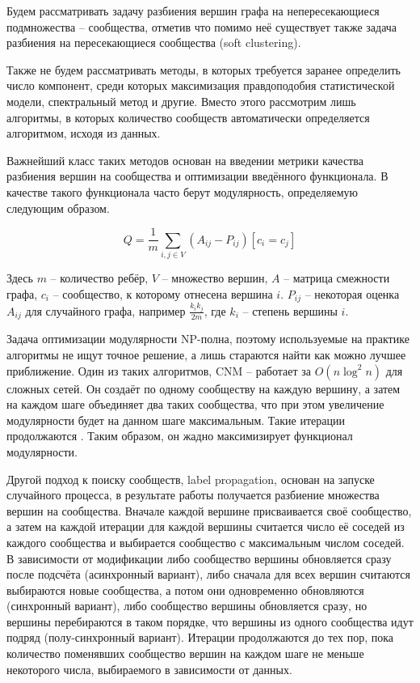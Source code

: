 \documentclass{article}
\begin{document}
Будем рассматривать задачу разбиения вершин графа на непересекающиеся подмножества -- сообщества, отметив что помимо неё существует также задача разбиения на пересекающиеся сообщества (soft clustering).


Также не будем рассматривать методы, в которых требуется заранее определить число компонент, среди которых максимизация правдоподобия статистической модели, спектральный метод и другие. Вместо этого рассмотрим лишь алгоритмы, в которых количество сообществ автоматически определяется алгоритмом, исходя из данных.

Важнейший класс таких методов основан на введении метрики качества разбиения вершин на сообщества и оптимизации введённого функционала. В качестве такого функционала часто берут модулярность, определяемую следующим образом.

$$ Q = \frac{1}{m} \sum_{i,j \in V} (A_{ij} - P_{ij}) [c_i = c_j] $$

Здесь $m$ -- количество ребёр, $V$ -- множество вершин, $A$ -- матрица смежности графа, $c_i$ -- сообщество, к которому отнесена вершина $i$. $P_{ij}$ -- некоторая оценка $A_{ij}$ для случайного графа, например $\frac{k_i k_j}{2m}$, где $k_i$ -- степень вершины $i$.

Задача оптимизации модулярности NP-полна, поэтому используемые на практике алгоритмы не ищут точное решение, а лишь стараются найти как можно лучшее приближение. Один из таких алгоритмов, CNM\cite{greedy_alg} --  работает за $O(n \log^2 n)$ для сложных сетей. Он создаёт по одному сообществу на каждую вершину, а затем на каждом шаге объединяет два таких сообщества, что при этом увеличение модулярности будет на данном шаге максимальным. Такие итерации продолжаются . Таким образом, он жадно максимизирует функционал модулярности.

Другой подход к поиску сообществ, label propagation\cite{label_prop}, основан на запуске случайного процесса, в результате работы получается разбиение множества вершин на сообщества. Вначале каждой вершине присваивается своё сообщество, а затем на каждой итерации для каждой вершины считается число её соседей из каждого сообщества и выбирается сообщество с максимальным числом соседей. В зависимости от модификации либо сообщество вершины обновляется сразу после подсчёта (асинхронный вариант), либо сначала для всех вершин считаются выбираются новые сообщества, а потом они одновременно обновляются (синхронный вариант), либо сообщество вершины обновляется сразу, но вершины перебираются в таком порядке, что вершины из одного сообщества идут подряд (полу-синхронный вариант). Итерации продолжаются до тех пор, пока количество поменявших сообщество вершин на каждом шаге не меньше некоторого числа, выбираемого в зависимости от данных.
\end{document}
